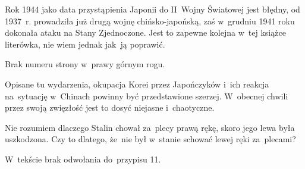 \documentclass[a4paper,11pt]{article}
\begin{document}
\vspace{\spaceFour}


\start {}

\vspace{\spaceFour}


\start {} Rok 1944 jako data przystąpienia Japonii do II~Wojny
Światowej jest błędny, od 1937~r. prowadziła już drugą wojnę
chińsko-japońską, zaś w~grudniu 1941 roku dokonała ataku na Stany
Zjednoczone. Jest to zapewne kolejna w~tej książce literówka, nie wiem
jednak jak~ją poprawić.

\vspace{\spaceFour}


\start {} Brak numeru strony w~prawy górnym rogu.

\vspace{\spaceFour}


\start {} Opisane tu wydarzenia, okupacja Korei przez
Japończyków i~ich reakcja na~sytuację w~Chinach powinny być
przedstawione szerzej. W~obecnej chwili przez swoją zwięzłość jest to
dosyć niejasne i~chaotyczne.

\vspace{\spaceFour}


\start {} Nie rozumiem dlaczego Stalin chował za~plecy prawą
rękę, skoro jego lewa była uszkodzona. Czy to dlatego, że~nie był
w~stanie schować lewej ręki za~plecami?

\vspace{\spaceFour}


\start {} W~tekście brak odwołania do~przypisu 11.

\vspace{\spaceFour}


\start {}

\vspace{\spaceFour}


\start {}

\vspace{\spaceFour}


\start {}
\end{document}

